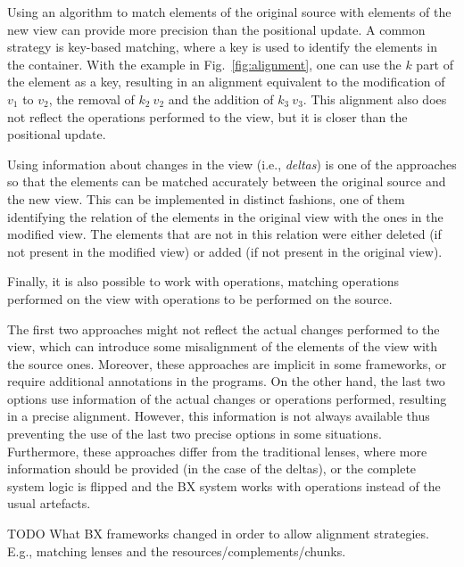 \documentclass[preprint,numbers]{sigplanconf}
\newcommand{\TODO}[1]{{\color{black!10!blue}TODO #1}}
\begin{document}
Using an algorithm to match elements of the original source with elements of the
new view can provide more precision than the positional update. A common
strategy is key-based matching, where a key is used to identify the elements
in the container. With the example in Fig.~\ref{fig:alignment}, one can use the
\(k\) part of the element as a key, resulting in an alignment equivalent to the
modification of \(v_1\) to \(v_2\), the removal of \(k_2~v_2\) and the addition
of \(k_3~v_3\). This alignment also does not reflect the operations performed to
the view, but it is closer than the positional update.

Using information about changes in the view (i.e., \emph{deltas}) is one of the
approaches so that
the elements can be matched accurately between the original source and the
new view. This can be implemented in distinct fashions, one of them identifying
the relation of the elements in the original view with the ones in the modified
view. The elements that are not in this relation were either deleted (if not
present in the modified view) or added (if not present in the original view).

Finally, it is also possible to work with operations, matching operations
performed on the view with operations to be performed on the source.

The first two approaches might not reflect the actual changes performed to the
view, which can introduce some misalignment of the elements of the view with the
source ones. Moreover, these approaches are implicit in some frameworks, or
require additional annotations in the programs. On the other hand, the last two
options use information of the
actual changes or operations performed, resulting in a precise alignment.
However, this information is not always available thus preventing the use of
the last two precise options in some situations. Furthermore, these approaches
differ from the traditional lenses, where more information should be provided
(in the case of the deltas), or the complete system logic is flipped and the BX
system works with operations instead of the usual artefacts.

\TODO{What BX frameworks changed in order to allow alignment strategies. E.g.,
matching lenses and the resources/complements/chunks.}
\end{document}
